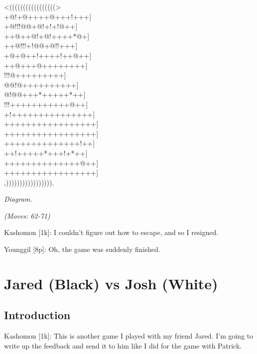 \documentclass[letterpaper,12pt]{memoir}
\newcounter{GoFigure}[part]
\newcommand{\gofigure}{%
 \stepcounter{GoFigure}
 \centerline{\textit{Diagram.\thinspace\arabic{GoFigure}}}
}
\newcommand{\subtext}[1]{\centerline{\textit{#1}}}
\begin{document}
\begin{minipage}[t]{0.5\textwidth}
{\gnos
<(((((((((((((((((>\\
+@!+@++++@+++!+++]\\
+@!!!@@+@!+!+!@++]\\
++@++@!+@!++++*@+]\\
++@!!!+!@@+@!!+++]\\
+@+@++!++++!++@++]\\
++@+++@++++++++]\\
!!!@+++++++++]\\
@@!@++++++++++]\\
@!@@+++*+++++*++]\\
!!!+++++++++++@++]\\
+!+++++++++++++++]\\
+++++++++++++++++]\\
+++++++++++++++++]\\
++++++++++++++!++]\\
++!+++++*+++!+*++]\\
++++++++++++++@++]\\
+++++++++++++++++]\\
,))))))))))))))))).\\
}
\gofigure

\subtext{(Moves: 62-71)}
\end{minipage}
\begin{minipage}[t]{0.5\textwidth}
\setlength{\parskip}{0.5em}
Kashomon [1k]: I couldn't figure out how to escape, and so I resigned.

Younggil [8p]: Oh, the game was suddenly finished.


\end{minipage}
\vfill
\part{Jared (Black) vs Josh (White)}
\chapter{Introduction}
Kashomon [1k]: This is another game I played with my friend Jared. I'm going to write up the feedback and send it to him like I did for the game with Patrick.
\end{document}
